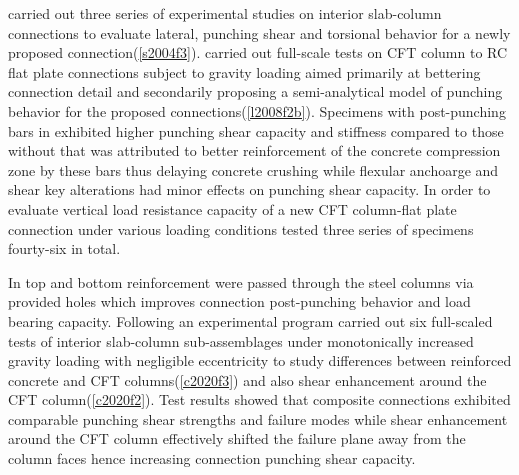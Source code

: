 \cite{satoh2004experimental} carried out three series of experimental studies on interior slab-column connections to evaluate lateral, punching shear and torsional behavior for a newly proposed connection(\ref{s2004f3}). \cite{LEE2008418} carried out full-scale tests on CFT column to RC flat plate connections subject to gravity loading aimed primarily at bettering connection detail and secondarily proposing a semi-analytical model of punching behavior for the proposed connections(\ref{l2008f2b}). Specimens with post-punching bars in \cite{LEE2008418} exhibited higher punching shear capacity and stiffness compared to those without that was attributed to better reinforcement of the concrete compression zone by these bars thus delaying concrete crushing while flexular anchoarge and shear key alterations had minor effects on punching shear capacity. In order to evaluate vertical load resistance capacity of a new CFT column-flat plate connection under various loading conditions \cite{yamaguchi2008experimental} tested three series of specimens fourty-six in total. 


In \cite{yan2014,lee2005,LEE2008418} top and bottom reinforcement were passed through the steel columns via provided holes which improves connection post-punching behavior and load bearing capacity. Following an experimental program \cite{chen2020} carried out six full-scaled tests of interior slab-column sub-assemblages under monotonically increased gravity loading with negligible eccentricity to study differences between reinforced concrete and CFT columns(\ref{c2020f3}) and also shear enhancement around the CFT column(\ref{c2020f2}). Test results showed that composite connections exhibited comparable punching shear strengths and failure modes while shear enhancement around the CFT column effectively shifted the failure plane away from the column faces hence increasing connection punching shear capacity\citep{chen2020}.

